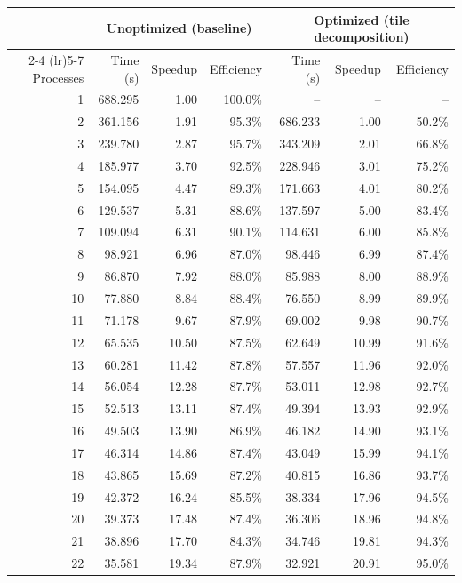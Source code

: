 \begin{longtable}{rrrrrrr}
    \toprule
    & \multicolumn{3}{c}{Unoptimized (baseline)} & \multicolumn{3}{c}{Optimized (tile decomposition)} \\
    \cmidrule(lr){2-4} \cmidrule(lr){5-7}
    Processes & Time (s) & Speedup & Efficiency & Time (s) & Speedup & Efficiency \\
    \midrule
    \endhead
    1 & 688.295 & 1.00 & 100.0\% & -- & -- & -- \\
    2 & 361.156 & 1.91 & 95.3\% & 686.233 & 1.00 & 50.2\% \\
    3 & 239.780 & 2.87 & 95.7\% & 343.209 & 2.01 & 66.8\% \\
    4 & 185.977 & 3.70 & 92.5\% & 228.946 & 3.01 & 75.2\% \\
    5 & 154.095 & 4.47 & 89.3\% & 171.663 & 4.01 & 80.2\% \\
    6 & 129.537 & 5.31 & 88.6\% & 137.597 & 5.00 & 83.4\% \\
    7 & 109.094 & 6.31 & 90.1\% & 114.631 & 6.00 & 85.8\% \\
    8 & 98.921 & 6.96 & 87.0\% & 98.446 & 6.99 & 87.4\% \\
    9 & 86.870 & 7.92 & 88.0\% & 85.988 & 8.00 & 88.9\% \\
    10 & 77.880 & 8.84 & 88.4\% & 76.550 & 8.99 & 89.9\% \\
    11 & 71.178 & 9.67 & 87.9\% & 69.002 & 9.98 & 90.7\% \\
    12 & 65.535 & 10.50 & 87.5\% & 62.649 & 10.99 & 91.6\% \\
    13 & 60.281 & 11.42 & 87.8\% & 57.557 & 11.96 & 92.0\% \\
    14 & 56.054 & 12.28 & 87.7\% & 53.011 & 12.98 & 92.7\% \\
    15 & 52.513 & 13.11 & 87.4\% & 49.394 & 13.93 & 92.9\% \\
    16 & 49.503 & 13.90 & 86.9\% & 46.182 & 14.90 & 93.1\% \\
    17 & 46.314 & 14.86 & 87.4\% & 43.049 & 15.99 & 94.1\% \\
    18 & 43.865 & 15.69 & 87.2\% & 40.815 & 16.86 & 93.7\% \\
    19 & 42.372 & 16.24 & 85.5\% & 38.334 & 17.96 & 94.5\% \\
    20 & 39.373 & 17.48 & 87.4\% & 36.306 & 18.96 & 94.8\% \\
    21 & 38.896 & 17.70 & 84.3\% & 34.746 & 19.81 & 94.3\% \\
    22 & 35.581 & 19.34 & 87.9\% & 32.921 & 20.91 & 95.0\% \\

\end{longtable}
